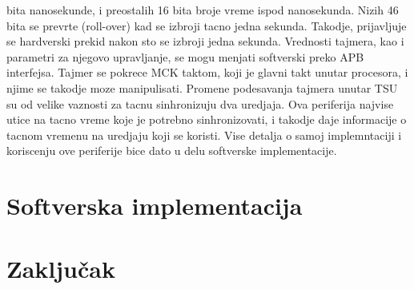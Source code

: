 \documentclass[a4paper,12pt, master]{etf}
\begin{document}
	bita nanosekunde, i preostalih 16 bita broje vreme ispod nanosekunda. Nizih 46 bita se prevrte
	(roll-over) kad se izbroji tacno jedna sekunda. Takodje, prijavljuje se hardverski prekid nakon
	sto se izbroji jedna sekunda. Vrednosti tajmera, kao i parametri za njegovo upravljanje, se
	mogu menjati softverski preko APB interfejsa. Tajmer se pokrece MCK taktom, koji je glavni takt
	unutar procesora, i njime se takodje moze manipulisati.
	Promene podesavanja tajmera unutar TSU su od velike vaznosti za tacnu sinhronizuju dva
	uredjaja. Ova periferija najvise utice na tacno vreme koje je potrebno sinhronizovati, i
	takodje daje informacije o tacnom vremenu na uredjaju koji se koristi. Vise detalja o samoj
	implemntaciji i koriscenju ove periferije bice dato u delu softverske implementacije.

	\newpage

	\chapter{Softverska implementacija}

	\newpage

	\chapter{Zaključak}

	\newpage
\end{document}
